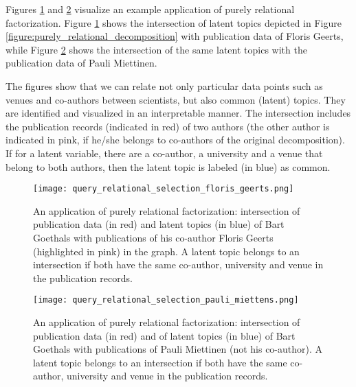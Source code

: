 Figures \ref{fig:instersection_purely_relational_floris} and \ref{fig:instersection_purely_relational_pauli} visualize an example application of purely relational factorization. Figure \ref{fig:instersection_purely_relational_floris} shows the intersection of latent topics depicted in Figure \ref{figure:purely_relational_decomposition} with publication data of Floris Geerts, while Figure \ref{fig:instersection_purely_relational_pauli} shows the intersection of the same latent topics with the publication data of Pauli Miettinen. 

The figures show that we can relate not only particular data points such as venues and co-authors between scientists, but also common (latent) topics. They are identified and visualized in an interpretable manner. The intersection includes the publication records (indicated in red) of two authors (the other author is indicated in pink, if he/she belongs to co-authors of the original decomposition). If for a latent variable, there are a co-author, a university and a venue that belong to both authors, then the latent topic is labeled (in blue) as common.
\begin{figure}[htb]
  \begin{center}
      \texttt{[image: query\_relational\_selection\_floris\_geerts.png]}
  \end{center}
  \caption{An application of purely relational factorization: intersection of publication data (in red) and latent topics (in blue) of Bart Goethals with publications of his co-author Floris Geerts (highlighted in pink) in the graph. A latent topic belongs to an intersection if both have the same co-author, university and venue in the publication records.}
  \label{fig:instersection_purely_relational_floris}
\end{figure}

\begin{figure}[htb]
  \begin{center}
      \texttt{[image: query\_relational\_selection\_pauli\_miettens.png]}
  \end{center}
  \caption{An application of purely relational factorization: intersection of publication data (in red) and of latent topics (in blue) of Bart Goethals with publications of Pauli Miettinen (not his co-author). A latent topic belongs to an intersection if both have the same co-author, university and venue in the publication records.}
  \label{fig:instersection_purely_relational_pauli}
\end{figure}


